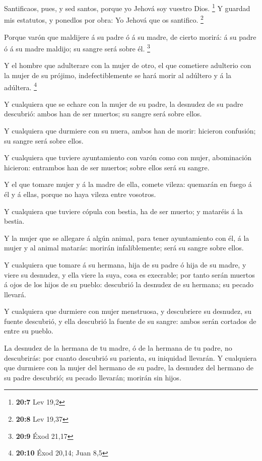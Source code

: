  Santificaos, pues, y sed santos, porque yo Jehová soy
vuestro Dios. \footnote{\textbf{20:7} Lev 19,2}  Y guardad
mis estatutos, y ponedlos por obra: Yo Jehová que os santifico.
\footnote{\textbf{20:8} Lev 19,37}

 Porque varón que maldijere á su padre ó á su madre, de
cierto morirá: á su padre ó á su madre maldijo; su sangre será sobre él.
\footnote{\textbf{20:9} Éxod 21,17}

 Y el hombre que adulterare con la mujer de otro, el que
cometiere adulterio con la mujer de su prójimo, indefectiblemente se
hará morir al adúltero y á la adúltera. \footnote{\textbf{20:10} Éxod
  20,14; Juan 8,5}

 Y cualquiera que se echare con la mujer de su padre, la
desnudez de su padre descubrió: ambos han de ser muertos; su sangre será
sobre ellos.

 Y cualquiera que durmiere con su nuera, ambos han de
morir: hicieron confusión; su sangre será sobre ellos.

 Y cualquiera que tuviere ayuntamiento con varón como con
mujer, abominación hicieron: entrambos han de ser muertos; sobre ellos
será su sangre.

 Y el que tomare mujer y á la madre de ella, comete vileza:
quemarán en fuego á él y á ellas, porque no haya vileza entre vosotros.

 Y cualquiera que tuviere cópula con bestia, ha de ser
muerto; y mataréis á la bestia.

 Y la mujer que se allegare á algún animal, para tener
ayuntamiento con él, á la mujer y al animal matarás: morirán
infaliblemente; será su sangre sobre ellos.

 Y cualquiera que tomare á su hermana, hija de su padre ó
hija de su madre, y viere su desnudez, y ella viere la suya, cosa es
execrable; por tanto serán muertos á ojos de los hijos de su pueblo:
descubrió la desnudez de su hermana; su pecado llevará.

 Y cualquiera que durmiere con mujer menstruosa, y
descubriere su desnudez, su fuente descubrió, y ella descubrió la fuente
de su sangre: ambos serán cortados de entre su pueblo.

 La desnudez de la hermana de tu madre, ó de la hermana de
tu padre, no descubrirás: por cuanto descubrió su parienta, su iniquidad
llevarán.  Y cualquiera que durmiere con la mujer del
hermano de su padre, la desnudez del hermano de su padre descubrió; su
pecado llevarán; morirán sin hijos.

